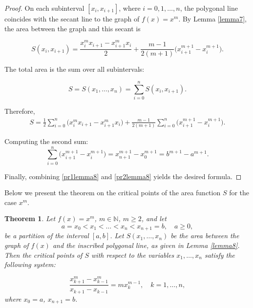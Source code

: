 \documentclass[amstex,16pt, amssymb]{article}
\theoremstyle{plain}
\newtheorem{theorem}{Theorem}[section]
\theoremstyle{definition}
\numberwithin{equation}{section}
\numberwithin{equation}{section}
\begin{document}
\begin{proof}
On each subinterval \([x_i, x_{i+1}]\), where \( i = 0, 1, \dots, n \),
the polygonal line coincides with the secant line to the graph of
\( f(x) = x^m \). By Lemma \ref{lemma7}, the area between the graph and this secant is

\[
S(x_i, x_{i+1}) =
\frac{x_i^m x_{i+1} - x_{i+1}^m x_i}{2}
+ \frac{m-1}{2(m+1)} \bigl( x_{i+1}^{m+1} - x_i^{m+1} \bigr).
\]

The total area is the sum over all subintervals:

\[
S=S(x_1, \dots, x_n) = \sum_{i=0}^{n} S(x_i, x_{i+1}).
\]

Therefore,
\begin{equation}\label{pr1lemma8}
\begin{aligned}
S
= \frac{1}{2} \sum_{i=0}^{n} \bigl( x_i^m x_{i+1} - x_{i+1}^m x_i \bigr) 
 + \frac{m-1}{2(m+1)} \sum_{i=0}^{n} \bigl( x_{i+1}^{m+1} - x_i^{m+1} \bigr).
\end{aligned}
\end{equation}

Computing the second sum:
\begin{equation}\label{pr2lemma8}
\sum_{i=0}^{n} \bigl( x_{i+1}^{m+1} - x_i^{m+1} \bigr)
= x_{n+1}^{m+1} - x_0^{m+1} = b^{m+1} - a^{m+1}.
\end{equation}

Finally, combining \eqref{pr1lemma8} and \eqref{pr2lemma8} yields the desired formula. 
\end{proof}

Below we present the theorem on the critical points of the area function $S$ for the case $x^m$.

\begin{theorem}\label{theorem2}
Let \( f(x) = x^m \), \( m \in \mathbb{N} \), \( m \ge 2 \), and let
\[
a = x_0 < x_1 < \dots < x_n < x_{n+1} = b, \quad a \ge 0, 
\]
be a partition of the interval \([a, b]\).
Let \( S(x_1, \dots, x_n) \) be the area between the graph of \( f(x) \) and the inscribed polygonal line, as given in Lemma \ref{lemma8}. Then the critical points of \( S \) with respect to the variables \( x_1, \dots, x_n \) satisfy the following system:

\[
\frac{x_{k+1}^m - x_{k-1}^m}{x_{k+1} - x_{k-1}} = m x_k^{m-1}, \quad k = 1, \dots, n,
\]
where \( x_0 = a \), \( x_{n+1} = b \).
\end{theorem}
\end{document}

